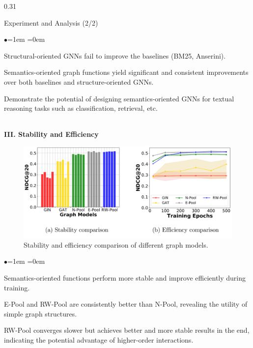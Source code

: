 \documentclass[serif,onlymath,final,xcolor=table]{beamer}
\begin{document}
\begin{frame}
\begin{columns}[t]
\begin{column}{0.31\linewidth}
\begin{block}{Experiment and Analysis (2/2)}
\begin{list}{$\bullet$}{\leftmargin=1em \itemindent=0em}
\item Structural-oriented GNNs fail to improve the baselines (BM25, Anserini).
\item Semantics-oriented graph functions yield signiﬁcant and consistent improvements over both baselines and structure-oriented GNNs.
\item Demonstrate the potential of designing semantics-oriented GNNs for textual reasoning tasks such as classiﬁcation, retrieval, etc.
\end{list}
~\\
\textbf{III. Stability and Efficiency} 
   \begin{figure}
    \includegraphics[width=\textwidth]{figures/stability_efficiency.pdf}
    \caption{Stability and efficiency comparison of different graph models.}
    \end{figure}
\begin{list}{$\bullet$}{\leftmargin=1em \itemindent=0em}
\item Semantics-oriented functions perform more stable and improve efficiently during training.
\item E-Pool and RW-Pool are consistently better than N-Pool, revealing the utility of simple graph structures.
\item RW-Pool converges slower but achieves better and more stable results in the end, indicating the potential advantage of higher-order interactions.
\end{list}
\end{block}


\end{column}
\end{columns}
\end{frame}
\end{document}
